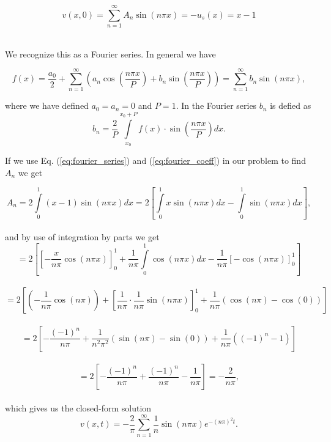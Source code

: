 \documentclass[12pt]{article}
\begin{document}
\begin{flushleft}
\vspace{5mm}
$$v(x,0) = \sum\limits_{n=1}^{\infty}A_n\sin(n\pi x) = -u_s(x) = x-1$$\\
\vspace{5mm}

We recognize this as a Fourier series. In general we have

\vspace{5mm}
\begin{equation}\label{eq:fourier_series}
f(x) = \frac{a_0}{2}+\sum\limits_{n=1}^{\infty}\left(a_n\cos\left(\frac{n\pi x}{P}\right) + b_n\sin\left(\frac{n\pi x}{P}\right)\right) = \sum\limits_{n=1}^{\infty}b_n \sin\left(n\pi x\right),
\end{equation}
\vspace{5mm}

where we have defined $a_0 = a_n = 0$ and $P = 1$. In the Fourier series $b_n$ is defied as 
\vspace{5mm}
\begin{equation}\label{eq:fourier_coeff}
b_n = \frac{2}{P}\int\limits_	{x_0}^{x_0+P}f(x)\cdot\sin\left(\frac{n\pi x}{P}\right) dx.
\end{equation}
\vspace{5mm}

If we use Eq. (\ref{eq:fourier_series}) and (\ref{eq:fourier_coeff}) in our problem to find $A_n$ we get

\vspace{5mm}
$$A_n = 2\int\limits_0^1 (x-1)\sin\left(n\pi x\right)dx = 2\left[\int\limits_0^1x\sin(n\pi x)dx - \int\limits_0^1\sin(n\pi x)dx\right],$$\\
\vspace{5mm}
and by use of integration by parts we get
\vspace{5mm}
$$ = 2\left[\left[-\frac{x}{n\pi}\cos(n\pi x)\right]_0^1 + \frac{1}{n\pi}\int\limits_0^1\cos(n\pi x)dx - \frac{1}{n\pi}\left[-\cos(n\pi x)\right]_0^1\right]$$\\
\vspace{5mm}
$$ = 2\left[\left(-\frac{1}{n\pi}\cos(n\pi)\right) + \left[\frac{1}{n\pi}\cdot\frac{1}{n\pi}\sin(n\pi x)\right]_0^1+\frac{1}{n\pi}\left(\cos(n\pi) - \cos(0)\right)\right]$$\\
\vspace{5mm}
$$ = 2\left[-\frac{(-1)^n}{n\pi} + \frac{1}{n^2\pi^2}\left(\sin(n\pi) - \sin(0)\right)+\frac{1}{n\pi}\left((-1)^n - 1\right)\right]$$\\
\vspace{5mm}
$$ = 2\left[-\frac{(-1)^n}{n\pi} + \frac{(-1)^n}{n\pi} -\frac{1}{n\pi}\right] = -\frac{2}{n\pi},$$\\
\vspace{5mm}
which gives us the closed-form solution
\vspace{5mm}
\begin{equation}\label{eq:closed_form_solution}
v(x,t) = -\frac{2}{\pi}\sum\limits_{n=1}^{\infty} \frac{1}{n}\sin\left(n\pi x\right)e^{-(n\pi)^2t}.
\end{equation}
\vspace{5mm}


\end{flushleft}
\end{document}
